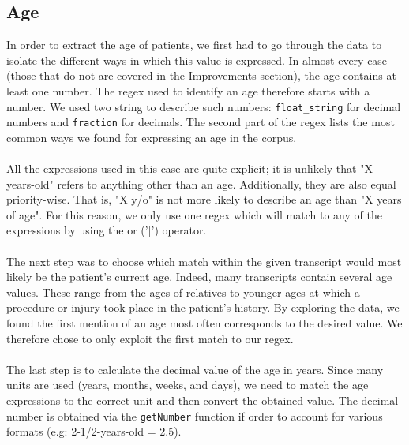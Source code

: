 \documentclass[10pt, a4paper, oneside]{article} %
\begin{document}
\subsection*{Age}
In order to extract the age of patients, we first had to go through the data to isolate the different ways in which this value is expressed. In almost every case (those that do not are covered in the Improvements section), the age contains at least one number. The regex used to identify an age therefore starts with a number. We used two string to describe such numbers: \texttt{float\_string} for decimal numbers and \texttt{fraction} for decimals. The second part of the regex lists the most common ways we found for expressing an age in the corpus. \\
\\
All the expressions used in this case are quite explicit; it is unlikely that "X-years-old" refers to anything other than an age. Additionally, they are also equal priority-wise. That is, "X y/o" is not more likely to describe an age than "X years of age". For this reason, we only use one regex which will match to any of the expressions by using the or ('|') operator.\\
\\
The next step was to choose which match within the given transcript would most likely be the patient's current age. Indeed, many transcripts contain several age values. These range from the ages of relatives to younger ages at which a procedure or injury took place in the patient's history. By exploring the data, we found the first mention of an age most often corresponds to the desired value. We therefore chose to only exploit the first match to our regex.\\
\\
The last step is to calculate the decimal value of the age in years. Since many units are used (years, months, weeks, and days), we need to match the age expressions to the correct unit and then convert the obtained value. The decimal number is obtained via the \texttt{getNumber} function if order to account for various formats (e.g: 2-1/2-years-old = 2.5).
\end{document}
